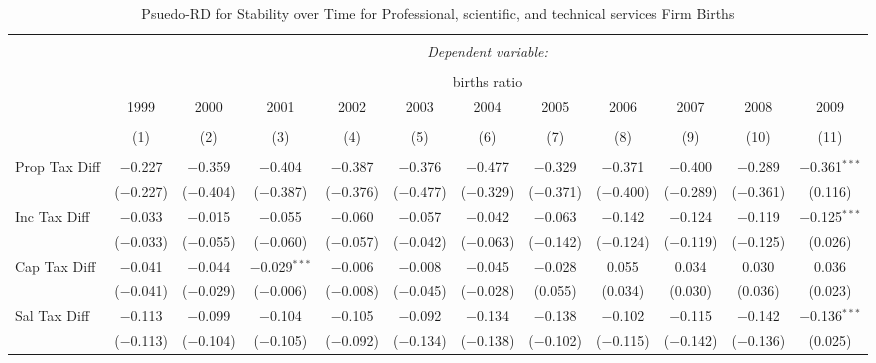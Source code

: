 
\begin{table}[!htbp] \centering 
  \caption{Psuedo-RD for Stability over Time for  Professional, scientific, and technical services Firm Births} 
  \label{54year} 
\small 
\begin{tabular}{@{\extracolsep{5pt}}lccccccccccc} 
\\[-1.8ex]\hline 
\hline \\[-1.8ex] 
 & \multicolumn{11}{c}{\textit{Dependent variable:}} \\ 
\cline{2-12} 
\\[-1.8ex] & \multicolumn{11}{c}{births ratio} \\ 
 & 1999 & 2000 & 2001 & 2002 & 2003 & 2004 & 2005 & 2006 & 2007 & 2008 & 2009 \\ 
\\[-1.8ex] & (1) & (2) & (3) & (4) & (5) & (6) & (7) & (8) & (9) & (10) & (11)\\ 
\hline \\[-1.8ex] 
 Prop Tax Diff & $-$0.227 & $-$0.359 & $-$0.404 & $-$0.387 & $-$0.376 & $-$0.477 & $-$0.329 & $-$0.371 & $-$0.400 & $-$0.289 & $-$0.361$^{***}$ \\ 
  & ($-$0.227) & ($-$0.404) & ($-$0.387) & ($-$0.376) & ($-$0.477) & ($-$0.329) & ($-$0.371) & ($-$0.400) & ($-$0.289) & ($-$0.361) & (0.116) \\ 
  Inc Tax Diff & $-$0.033 & $-$0.015 & $-$0.055 & $-$0.060 & $-$0.057 & $-$0.042 & $-$0.063 & $-$0.142 & $-$0.124 & $-$0.119 & $-$0.125$^{***}$ \\ 
  & ($-$0.033) & ($-$0.055) & ($-$0.060) & ($-$0.057) & ($-$0.042) & ($-$0.063) & ($-$0.142) & ($-$0.124) & ($-$0.119) & ($-$0.125) & (0.026) \\ 
  Cap Tax Diff & $-$0.041 & $-$0.044 & $-$0.029$^{***}$ & $-$0.006 & $-$0.008 & $-$0.045 & $-$0.028 & 0.055 & 0.034 & 0.030 & 0.036 \\ 
  & ($-$0.041) & ($-$0.029) & ($-$0.006) & ($-$0.008) & ($-$0.045) & ($-$0.028) & (0.055) & (0.034) & (0.030) & (0.036) & (0.023) \\ 
  Sal Tax Diff & $-$0.113 & $-$0.099 & $-$0.104 & $-$0.105 & $-$0.092 & $-$0.134 & $-$0.138 & $-$0.102 & $-$0.115 & $-$0.142 & $-$0.136$^{***}$ \\ 
  & ($-$0.113) & ($-$0.104) & ($-$0.105) & ($-$0.092) & ($-$0.134) & ($-$0.138) & ($-$0.102) & ($-$0.115) & ($-$0.142) & ($-$0.136) & (0.025) \\ 

\end{tabular}
\end{table}
